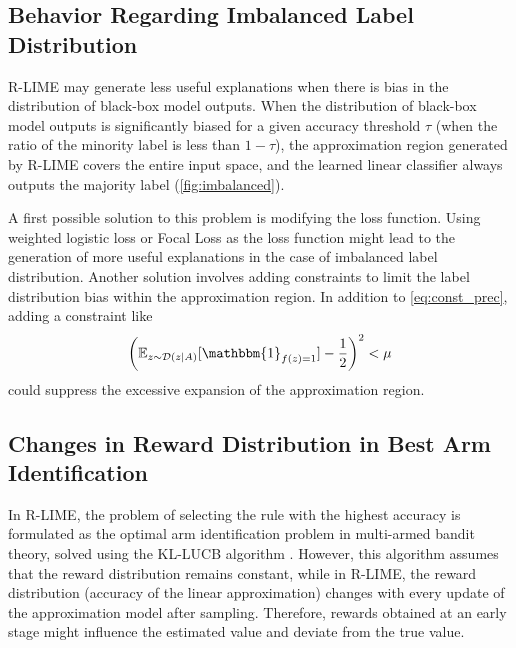\documentclass[11pt]{article}
\begin{document}
\subsection{Behavior Regarding Imbalanced Label Distribution}
R-LIME may generate less useful explanations
when there is bias in the distribution of black-box model outputs.
When the distribution of black-box model outputs is significantly biased
for a given accuracy threshold $\tau$
(when the ratio of the minority label is less than $1-\tau$),
the approximation region generated by R-LIME covers the entire input space,
and the learned linear classifier always outputs the majority label
(\cref{fig:imbalanced}).

A first possible solution to this problem is modifying the loss function.
Using weighted logistic loss or Focal Loss \cite{lin2020focal}
as the loss function might lead to the generation of more useful explanations
in the case of imbalanced label distribution.
Another solution involves adding constraints
to limit the label distribution bias within the approximation region.
In addition to \cref{eq:const_prec}, adding a constraint like
\begin{equation}
	{\left(\mathbb{E}_{z\sim\mathcal{D}(z\mid A)}[\mathbbm{1}_{f(z)=1}]-\frac{1}{2}\right)}^2<\mu
\end{equation}
could suppress the excessive expansion of the approximation region.

\subsection{Changes in Reward Distribution in Best Arm Identification}\label{sec:reward}
{%
	\renewcommand{\arraystretch}{1.1}
	\begin{table}[tbp]
		\centering
		\caption[Deviation between the estimated accuracy and the true accuracy]{%
			Deviation between the estimated accuracy and the true accuracy.
			Deviation was relatively small considering confidence level $1-\delta=0.95$.
		}\label{tab:reward}
		
	\end{table}
}
In R-LIME,
the problem of selecting the rule with the highest accuracy is formulated
as the optimal arm identification problem in multi-armed bandit theory,
solved using the KL-LUCB algorithm \cite{kaufmann2013information}.
However, this algorithm assumes that the reward distribution remains constant,
while in R-LIME,
the reward distribution (accuracy of the linear approximation)
changes with every update of the approximation model after sampling.
Therefore, rewards obtained at an early stage
might influence the estimated value and deviate from the true value.
\end{document}
